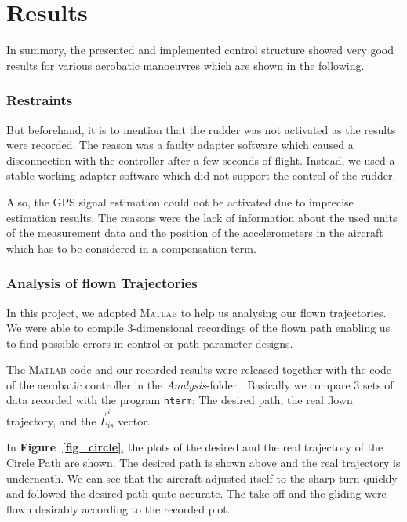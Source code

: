 \documentclass[11pt,a4paper]{scrartcl}		%
\begin{document}
\medskip





\section{Results}\label{ch-Results}


In summary, the presented and implemented control structure showed very good results for various aerobatic manoeuvres which are shown in the following.

\subsubsection*{Restraints}

But beforehand, it is to mention that the rudder was not activated as the results were recorded.
The reason was a faulty adapter software which caused a disconnection with the controller after a few seconds of flight. Instead, we used a stable working adapter software which did not support the control of the rudder.

Also, the GPS signal estimation could not be activated due to imprecise estimation results.
The reasons were the lack of information about the used units of the measurement data and the position of the accelerometers in the aircraft which has to be considered in a compensation term.

\subsubsection*{Analysis of flown Trajectories}

In this project, we adopted \textsc{Matlab} to help us analysing our flown trajectories. 
We were able to compile 3-dimensional recordings of the flown path enabling us to find possible errors in control or path parameter designs.

The \textsc{Matlab} code and our recorded results were released together with the code of the aerobatic controller in the \textsl{Analysis}-folder . 
Basically we compare 3 sets of data recorded with the program \texttt{hterm}: The desired path, the real flown trajectory, and the $\vec{L}_{is}^i$ vector. 

\medskip

In \textbf{Figure~\ref{fig_circle}}, the plots of the desired and the real trajectory of the Circle Path are shown. 
The desired path is shown above and the real trajectory is underneath. 
We can see that the aircraft adjusted itself to the sharp turn quickly and followed the desired path quite accurate. The take off and the gliding were flown desirably according to the recorded plot.
\end{document}
